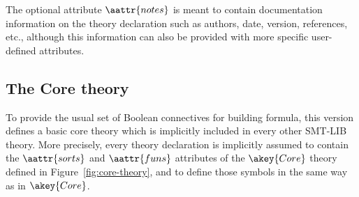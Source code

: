 The optional attribute $\aattr{notes}$ is meant 
to contain documentation information on the theory declaration 
such as authors, date, version, references, etc.,
although this information can also be provided 
with more specific user-defined attributes.


\subsection{The Core theory}



To provide the usual set of Boolean connectives for building formula,
this version defines a basic core theory 
which is implicitly included in every other SMT-LIB theory.
More precisely, every theory declaration is implicitly assumed to contain
the $\aattr{sorts}$ and $\aattr{funs}$ attributes of the $\akey{Core}$ theory
defined in Figure~\ref{fig:core-theory},
and to define those symbols in the same way as in $\akey{Core}$.

